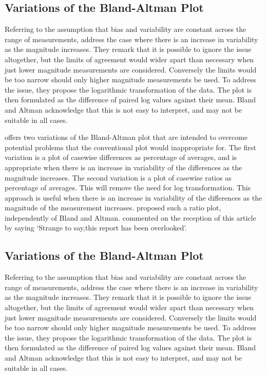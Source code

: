 \documentclass[Main.tex]{subfiles}
\begin{document}

	\subsection{Variations of the Bland-Altman Plot} Referring to the
	assumption that bias and variability are constant across the range
	of measurements, \citet{BA99} address the case where there is an
	increase in variability as the magnitude increases. They remark
	that it is possible to ignore the issue altogether, but the limits
	of agreement would wider apart than necessary when just lower
	magnitude measurements are considered. Conversely the limits would
	be too narrow should only higher magnitude measurements be used.
	To address the issue, they propose the logarithmic transformation
	of the data. The plot is then formulated as the difference of
	paired log values against their mean. Bland and Altman acknowledge
	that this is not easy to interpret, and may not be suitable in
	all cases.
	
	\citet{BA99} offers two variations of the Bland-Altman plot that
	are intended to overcome potential problems that the conventional
	plot would inappropriate for. The first variation is a plot of
	casewise differences as percentage of averages, and is appropriate
	when there is an increase in variability of the differences as the
	magnitude increases. The second variation is a plot of casewise
	ratios as percentage of averages. This will remove the need for
	log transformation. This approach is useful when there is an
	increase in variability of the differences as the magnitude of the
	measurement increases. \citet{Eksborg} proposed such a ratio plot,
	independently of Bland and Altman. \citet{Dewitte} commented on
	the reception of this article by saying `Strange to say,this
	report has been overlooked'.
	
	
	
	
	\subsection{Variations of the Bland-Altman Plot} Referring to the
	assumption that bias and variability are constant across the range
	of measurements, \citet{BA99} address the case where there is an
	increase in variability as the magnitude increases. They remark
	that it is possible to ignore the issue altogether, but the limits
	of agreement would wider apart than necessary when just lower
	magnitude measurements are considered. Conversely the limits would
	be too narrow should only higher magnitude measurements be used.
	To address the issue, they propose the logarithmic transformation
	of the data. The plot is then formulated as the difference of
	paired log values against their mean. Bland and Altman acknowledge
	that this is not easy to interpret, and may not be suitable in
	all cases.
	
\end{document}
